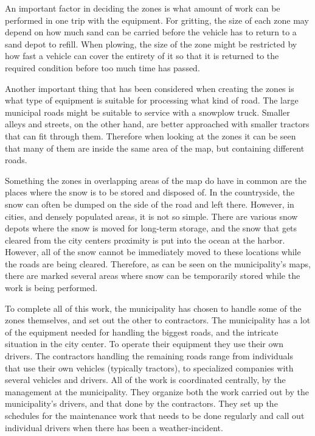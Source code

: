 An important factor in deciding the zones is what amount of work can be performed in one trip with the equipment. For gritting, the size of each zone may depend on how much sand can be carried before the vehicle has to return to a sand depot to refill. When plowing, the size of the zone might be restricted by how fast a vehicle can cover the entirety of it so that it is returned to the required condition before too much time has passed.

Another important thing that has been considered when creating the zones is what type of equipment is suitable for processing what kind of road. The large municipal roads might be suitable to service with a snowplow truck. Smaller alleys and streets, on the other hand, are better approached with smaller tractors that can fit through them. Therefore when looking at the zones it can be seen that many of them are inside the same area of the map, but containing different roads.

Something the zones in overlapping areas of the map do have in common are the places where the snow is to be stored and disposed of. In the countryside, the snow can often be dumped on the side of the road and left there. However, in cities, and densely populated areas, it is not so simple. There are various snow depots where the snow is moved for long-term storage, and the snow that gets cleared from the city centers proximity is put into the ocean at the harbor. However, all of the snow cannot be immediately moved to these locations while the roads are being cleared. Therefore, as can be seen on the municipality's maps, there are marked several areas where snow can be temporarily stored while the work is being performed.

To complete all of this work, the municipality has chosen to handle some of the zones themselves, and set out the other to contractors. The municipality has a lot of the equipment needed for handling the biggest roads, and the intricate situation in the city center. To operate their equipment they use their own drivers. The contractors handling the remaining roads range from individuals that use their own vehicles (typically tractors), to specialized companies with several vehicles and drivers. All of the work is coordinated centrally, by the management at the municipality. They organize both the work carried out by the municipality's drivers, and that done by the contractors. They set up the schedules for the maintenance work that needs to be done regularly and call out individual drivers when there has been a weather-incident.


